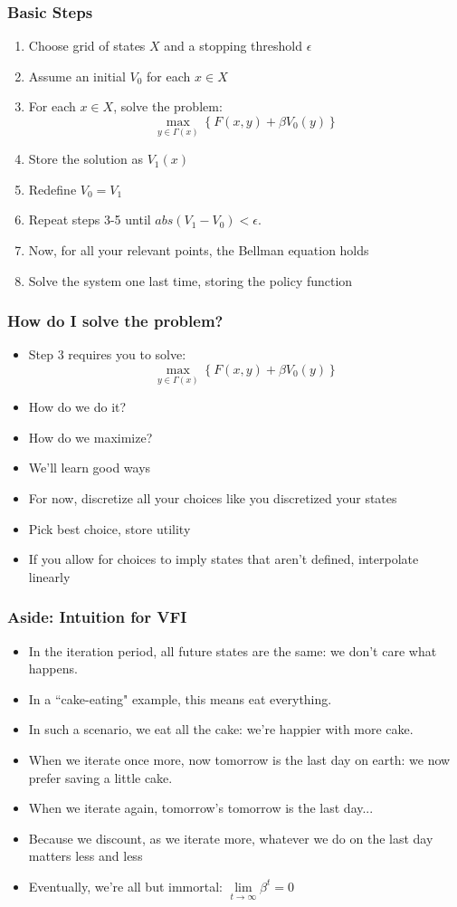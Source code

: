 \documentclass{beamer}
\begin{document}
\begin{frame}
\frametitle[alignment=center]{Basic Steps}
\begin{enumerate}
\item Choose grid of states $X$ and a stopping threshold $\epsilon$
\item Assume an initial $V_0$ for each $x\in X$
\item For each $x\in X$, solve the problem:
$$\underset{y\in\Gamma(x)}{\max}\left\{F(x,y)+\beta V_0(y)\right\}$$
\item Store the solution as $V_1(x)$
\item Redefine $V_0=V_1$
\item Repeat steps 3-5 until $abs(V_1-V_0)<\epsilon$. 
\item Now, for all your relevant points, the Bellman equation holds
\item Solve the system one last time, storing the policy function
\end{enumerate}
\end{frame}

\begin{frame}
\frametitle[alignment=center]{How do I solve the problem?}
\begin{itemize}
\item Step 3 requires you to solve:
$$\underset{y\in\Gamma(x)}{\max}\left\{F(x,y)+\beta V_0(y)\right\}$$
\item How do we do it?  
\item How do we maximize?
\item We'll learn good ways
\item For now, discretize all your choices like you discretized your states
\item Pick best choice, store utility
\item If you allow for choices to imply states that aren't defined, interpolate linearly
\end{itemize}
\end{frame}

\begin{frame}
\frametitle[alignment=center]{Aside: Intuition for VFI}
\begin{itemize}
\item In the iteration period, all future states are the same: we don't care what happens.
\item In a ``cake-eating" example, this means eat everything.
\item In such a scenario, we eat all the cake: we're happier with more cake.
\item When we iterate once more, now tomorrow is the last day on earth: we now prefer saving a little cake.
\item When we iterate again, tomorrow's tomorrow is the last day...
\item Because we discount, as we iterate more, whatever we do on the last day matters less and less
\item Eventually, we're all but immortal: $\underset{t\rightarrow\infty}\lim\beta^t=0$ 
\end{itemize}
\end{frame}
\end{document}
